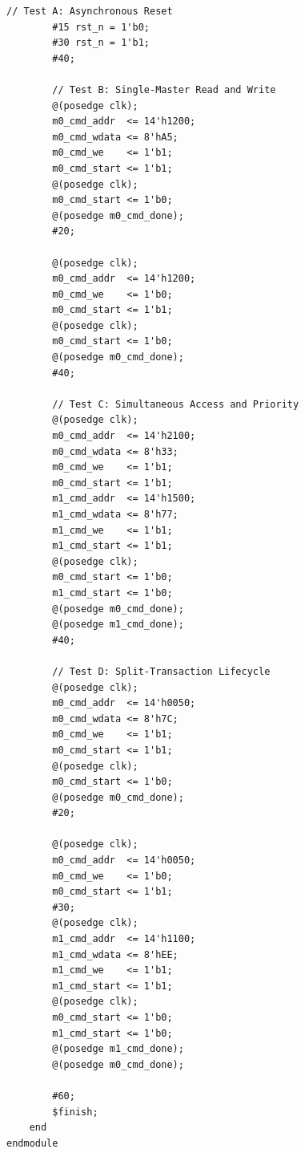 \documentclass[11pt,a4paper]{article}
\begin{document}
\begin{lstlisting}[caption={Simulation Testbench: \texttt{tb\_top\_bus\_system.v}}]
        // Test A: Asynchronous Reset
        #15 rst_n = 1'b0;
        #30 rst_n = 1'b1;
        #40;

        // Test B: Single-Master Read and Write
        @(posedge clk);
        m0_cmd_addr  <= 14'h1200;
        m0_cmd_wdata <= 8'hA5;
        m0_cmd_we    <= 1'b1;
        m0_cmd_start <= 1'b1;
        @(posedge clk);
        m0_cmd_start <= 1'b0;
        @(posedge m0_cmd_done);
        #20;

        @(posedge clk);
        m0_cmd_addr  <= 14'h1200;
        m0_cmd_we    <= 1'b0;
        m0_cmd_start <= 1'b1;
        @(posedge clk);
        m0_cmd_start <= 1'b0;
        @(posedge m0_cmd_done);
        #40;

        // Test C: Simultaneous Access and Priority
        @(posedge clk);
        m0_cmd_addr  <= 14'h2100;
        m0_cmd_wdata <= 8'h33;
        m0_cmd_we    <= 1'b1;
        m0_cmd_start <= 1'b1;
        m1_cmd_addr  <= 14'h1500;
        m1_cmd_wdata <= 8'h77;
        m1_cmd_we    <= 1'b1;
        m1_cmd_start <= 1'b1;
        @(posedge clk);
        m0_cmd_start <= 1'b0;
        m1_cmd_start <= 1'b0;
        @(posedge m0_cmd_done);
        @(posedge m1_cmd_done);
        #40;

        // Test D: Split-Transaction Lifecycle
        @(posedge clk);
        m0_cmd_addr  <= 14'h0050;
        m0_cmd_wdata <= 8'h7C;
        m0_cmd_we    <= 1'b1;
        m0_cmd_start <= 1'b1;
        @(posedge clk);
        m0_cmd_start <= 1'b0;
        @(posedge m0_cmd_done);
        #20;

        @(posedge clk);
        m0_cmd_addr  <= 14'h0050;
        m0_cmd_we    <= 1'b0;
        m0_cmd_start <= 1'b1;
        #30;
        @(posedge clk);
        m1_cmd_addr  <= 14'h1100;
        m1_cmd_wdata <= 8'hEE;
        m1_cmd_we    <= 1'b1;
        m1_cmd_start <= 1'b1;
        @(posedge clk);
        m0_cmd_start <= 1'b0;
        m1_cmd_start <= 1'b0;
        @(posedge m1_cmd_done);
        @(posedge m0_cmd_done);

        #60;
        $finish;
    end
endmodule
\end{lstlisting}
\end{document}
